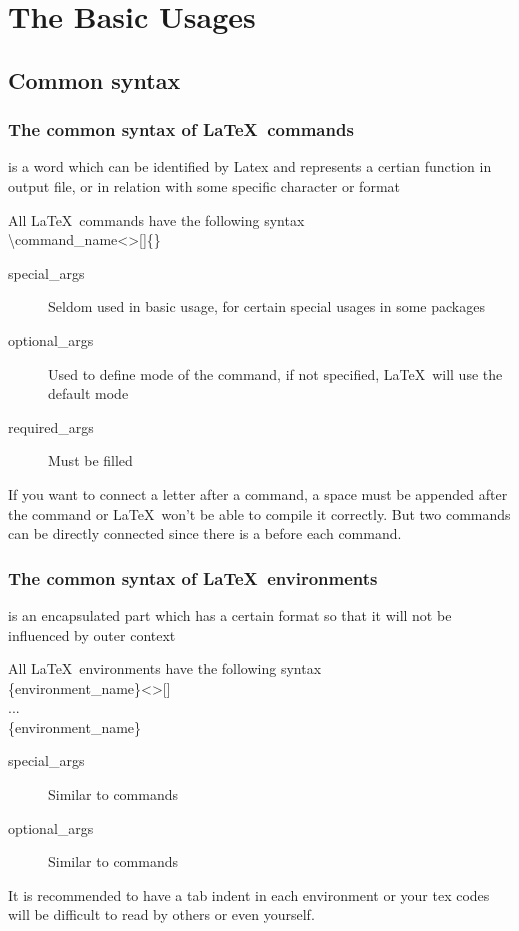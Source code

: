 \documentclass{beamer}
\begin{document}
\section{The Basic Usages}
\begin{frame}
\end{frame}

\subsection{Common syntax}

\begin{frame}
	\frametitle{The common syntax of \LaTeX\ commands}
	\begin{definition}
		 is a word which can be identified by Latex and represents a certian function in output file, or in relation with some specific character or format
	\end{definition}
	All \LaTeX\ commands have the following syntax\\
	\alert{\textbackslash command\_name}\textless {}\textgreater []\{\}
	\begin{description}
		\item[special\_args]	Seldom used in basic usage, for certain special usages in some packages
		\item[optional\_args]	Used to define mode of the command, if not specified, \LaTeX\ will use the default mode
		\item[required\_args]	Must be filled
	\end{description}
	If you want to connect a letter after a command, a space must be appended after the command or \LaTeX\ won't be able to compile it correctly. But two commands can be directly connected since there is a \structure{\textbackslash} before each command.
\end{frame}

\begin{frame}
	\frametitle{The common syntax of \LaTeX\ environments}
	\begin{definition}
		 is an encapsulated part which has a certain format so that it will not be influenced by outer context
	\end{definition}
	All \LaTeX\ environments have the following syntax\\
	\{\alert{environment\_name}\}\textless {}\textgreater []\\
	\qquad...\\
	\{\alert{environment\_name}\}\\
	\begin{description}
		\item[special\_args]	Similar to commands
		\item[optional\_args]	Similar to commands
	\end{description}
	It is recommended to have a tab indent in each environment or your tex codes will be difficult to read by others or even \alert{yourself}.
\end{frame}
\end{document}
